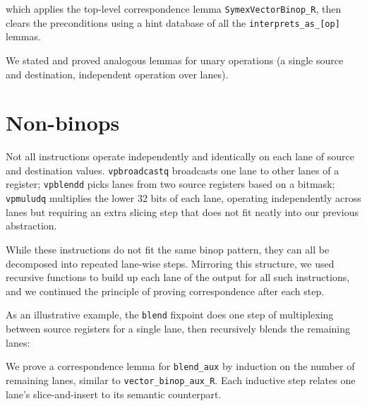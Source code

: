 
\noindent which applies the top-level correspondence lemma \texttt{SymexVectorBinop_R}, then clears the preconditions using a hint database of all the \texttt{interprets_as_[op]} lemmas.

We stated and proved analogous lemmas for unary operations (a single source and destination, independent operation over lanes).

\section{Non-binops}

Not all instructions operate independently and identically on each lane of source and destination values. \texttt{vpbroadcastq} broadcasts one lane to other lanes of a register; \texttt{vpblendd} picks lanes from two source registers based on a bitmask; \texttt{vpmuludq} multiplies the lower 32 bits of each lane, operating independently across lanes but requiring an extra slicing step that does not fit neatly into our previous abstraction.

While these instructions do not fit the same binop pattern, they can all be decomposed into repeated lane-wise steps. Mirroring this structure, we used recursive functions to build up each lane of the output for all such instructions, and we continued the principle of proving correspondence after each step.

As an illustrative example, the \texttt{blend} fixpoint does one step of multiplexing between source registers for a single lane, then recursively blends the remaining lanes:


We prove a correspondence lemma for \texttt{blend_aux} by induction on the number of remaining lanes, similar to \texttt{vector_binop_aux_R}. Each inductive step relates one lane's slice-and-insert to its semantic counterpart.

